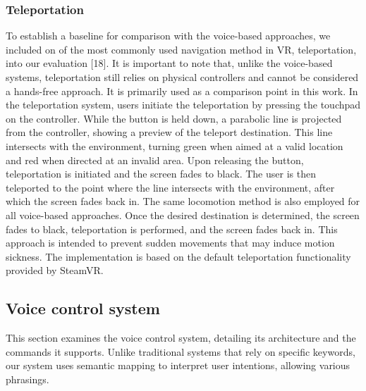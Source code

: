 \documentclass[preprint,12pt]{elsarticle}
\newcommand{\reftext}[1]{{\color{gray}#1}}   %
\begin{document}
\subsubsection{Teleportation}
\reftext{To establish a baseline for comparison with the voice-based approaches, we included on of the most commonly used navigation method in VR, teleportation, into our evaluation [18]. It is important to note that, unlike the voice-based systems, teleportation still relies on physical controllers and cannot be considered a hands-free approach. It is primarily used as a comparison point in this work. In the teleportation system, users initiate the teleportation by pressing the touchpad on the controller. While the button is held down, a parabolic line is projected from the controller, showing a preview of the teleport destination. This line intersects with the environment, turning green when aimed at a valid location and red when directed at an invalid area. Upon releasing the button, teleportation is initiated and the screen fades to black. The user is then teleported to the point where the line intersects with the environment, after which the screen fades back in. The same locomotion method is also employed for all voice-based approaches. Once the desired destination is determined, the screen fades to black, teleportation is performed, and the screen fades back in. This approach is intended to prevent sudden movements that may induce motion sickness. The implementation is based on the default teleportation functionality provided by SteamVR.}

\subsection{Voice control system}
\reftext{This section examines the voice control system, detailing its architecture and the commands it supports. Unlike traditional systems that rely on specific keywords, our system uses semantic mapping to interpret user intentions, allowing various phrasings.}
\end{document}
